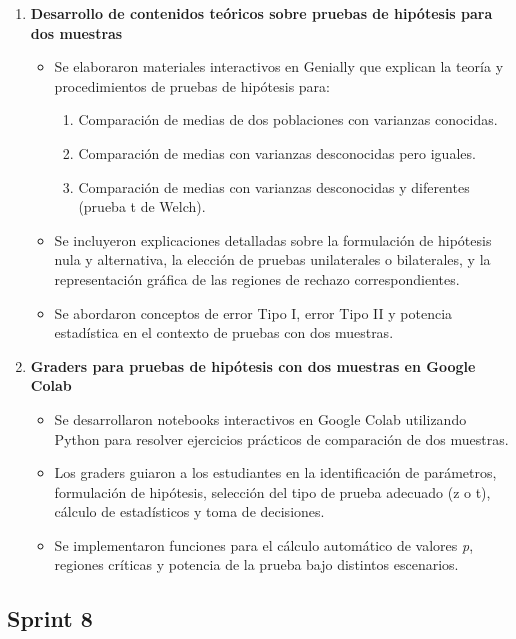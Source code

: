 \documentclass[letter,oneside,12pt,spanish]{report}
\begin{document}
\begin{enumerate}
	\item \textbf{Desarrollo de contenidos teóricos sobre pruebas de hipótesis para dos muestras}  
	\begin{itemize}
		\item Se elaboraron materiales interactivos en Genially que explican la teoría y procedimientos de pruebas de hipótesis para:
		\begin{enumerate}
			\item Comparación de medias de dos poblaciones con varianzas conocidas.
			\item Comparación de medias con varianzas desconocidas pero iguales.
			\item Comparación de medias con varianzas desconocidas y diferentes (prueba t de Welch).
		\end{enumerate}
		\item Se incluyeron explicaciones detalladas sobre la formulación de hipótesis nula y alternativa, la elección de pruebas unilaterales o bilaterales, y la representación gráfica de las regiones de rechazo correspondientes.
		\item Se abordaron conceptos de error Tipo I, error Tipo II y potencia estadística en el contexto de pruebas con dos muestras.
	\end{itemize}
	
	\item \textbf{Graders para pruebas de hipótesis con dos muestras en Google Colab}  
	\begin{itemize}
		\item Se desarrollaron notebooks interactivos en Google Colab utilizando Python para resolver ejercicios prácticos de comparación de dos muestras.
		\item Los graders guiaron a los estudiantes en la identificación de parámetros, formulación de hipótesis, selección del tipo de prueba adecuado (z o t), cálculo de estadísticos y toma de decisiones.
		\item Se implementaron funciones para el cálculo automático de valores \textit{p}, regiones críticas y potencia de la prueba bajo distintos escenarios.
	\end{itemize}
	
\end{enumerate}

\subsection{Sprint 8}
\end{document}
